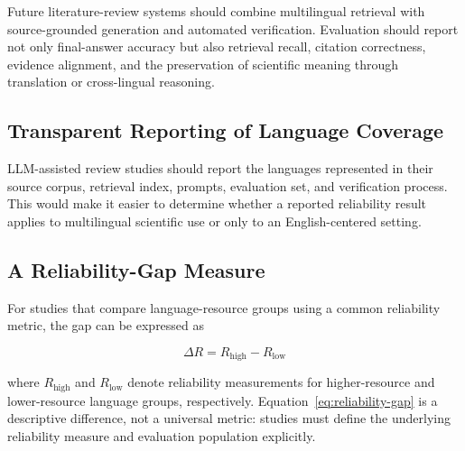 \documentclass[acmsmall,screen,review]{acmart}
\begin{document}
Future literature-review systems should combine multilingual retrieval with source-grounded generation and automated verification. Evaluation should report not only final-answer accuracy but also retrieval recall, citation correctness, evidence alignment, and the preservation of scientific meaning through translation or cross-lingual reasoning.


\subsection{Transparent Reporting of Language Coverage}
\label{sec:reporting-gap}

LLM-assisted review studies should report the languages represented in their source corpus, retrieval index, prompts, evaluation set, and verification process. This would make it easier to determine whether a reported reliability result applies to multilingual scientific use or only to an English-centered setting.


\subsection{A Reliability-Gap Measure}
\label{sec:gap-measure}

For studies that compare language-resource groups using a common reliability metric, the gap can be expressed as

\begin{equation}
\Delta R = R_{\mathrm{high}} - R_{\mathrm{low}}
\label{eq:reliability-gap}
\end{equation}

where $R_{\mathrm{high}}$ and $R_{\mathrm{low}}$ denote reliability measurements for higher-resource and lower-resource language groups, respectively. Equation~\ref{eq:reliability-gap} is a descriptive difference, not a universal metric: studies must define the underlying reliability measure and evaluation population explicitly.

\end{document}
